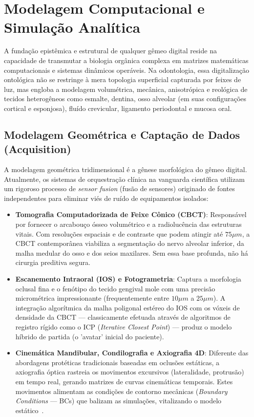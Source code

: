 \section{Modelagem Computacional e Simulação Analítica}

A fundação epistêmica e estrutural de qualquer gêmeo digital reside na capacidade de transmutar a biologia orgânica complexa em matrizes matemáticas computacionais e sistemas dinâmicos operáveis. Na odontologia, essa digitalização ontológica não se restringe à mera topologia superficial capturada por feixes de luz, mas engloba a modelagem volumétrica, mecânica, anisotrópica e reológica de tecidos heterogêneos como esmalte, dentina, osso alveolar (em suas configurações cortical e esponjosa), fluído crevicular, ligamento periodontal e mucosa oral.

\subsection{Modelagem Geométrica e Captação de Dados (Acquisition)}

A modelagem geométrica tridimensional é a gênese morfológica do gêmeo digital. Atualmente, os sistemas de orquestração clínica na vanguarda científica utilizam um rigoroso processo de \textit{sensor fusion} (fusão de sensores) originado de fontes independentes para eliminar viés de ruído de equipamentos isolados:

\begin{itemize}
    \item \textbf{Tomografia Computadorizada de Feixe Cônico (CBCT)}: Responsável por fornecer o arcabouço ósseo volumétrico e a radiolucência das estruturas vitais. Com resoluções espaciais e de contraste que podem atingir até $75 \mu m$, a CBCT contemporânea viabiliza a segmentação do nervo alveolar inferior, da malha medular do osso e dos seios maxilares. Sem essa base profunda, não há cirurgia preditiva segura.
    \item \textbf{Escanemento Intraoral (IOS) e Fotogrametria}: Captura a morfologia oclusal fina e o fenótipo do tecido gengival mole com uma precisão micrométrica impressionante (frequentemente entre $10 \mu m$ a $25 \mu m$). A integração algorítmica da malha poligonal estéreo do IOS com os vóxeis de densidade da CBCT --- classicamente efetuada através de algoritmos de registro rígido como o ICP (\textit{Iterative Closest Point}) --- produz o modelo híbrido de partida (o 'avatar' inicial do paciente).
    \item \textbf{Cinemática Mandibular, Condilografia e Axiografia 4D}: Diferente das abordagens protéticas tradicionais baseadas em oclusões estáticas, a axiografia óptica rastreia os movimentos excursivos (lateralidade, protrusão) em tempo real, gerando matrizes de curvas cinemáticas temporais. Estes movimentos alimentam as condições de contorno mecânicas (\textit{Boundary Conditions} --- BCs) que balizam as simulações, vitalizando o modelo estático~\cite{katsoulakis2024digital}.
\end{itemize}

